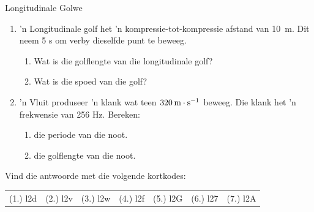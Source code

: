 \begin{eocexercises}{Longitudinale Golwe}
\begin{enumerate}[noitemsep, label=\textbf{\arabic*}. ]
    \par
          \label{m38783*uid38}\item 'n Longitudinale golf het 'n kompressie-tot-kompressie afstand van 10~m. Dit neem 5 s om verby dieselfde punt te beweeg.
\label{m38783*id294078}\begin{enumerate}[noitemsep, label=\textbf{\alph*}. ] 
            \label{m38783*uid39}\item Wat is die golflengte van die longitudinale golf?
\label{m38783*uid40}\item Wat is die spoed van die golf?
\end{enumerate}
                \label{m38783*uid41}\item 'n Vluit produseer 'n klank wat teen $320\phantom{\rule{2pt}{0ex}}\text{m}\ensuremath{\cdot}\text{s}{}^{-1}$ beweeg. Die klank het 'n frekwensie van 256 Hz. Bereken:
\label{m38783*id294137}\begin{enumerate}[noitemsep, label=\textbf{\alph*}. ] 
            \label{m38783*uid42}\item die periode van die noot.
\label{m38783*uid43}\item die golflengte van die noot.
\end{enumerate}
                \end{enumerate}
  \label{m38783**end}
  \label{e91550bed2a1600e0ddb2572d580bf8e**end}
\par {} Vind die antwoorde met die volgende kortkodes:
 \par \begin{tabular}[h]{cccccc}
 (1.) l2d  &  (2.) l2v  &  (3.) l2w  &  (4.) l2f  &  (5.) l2G  &  (6.) l27  &  (7.) l2A  & \end{tabular}
\end{eocexercises}
